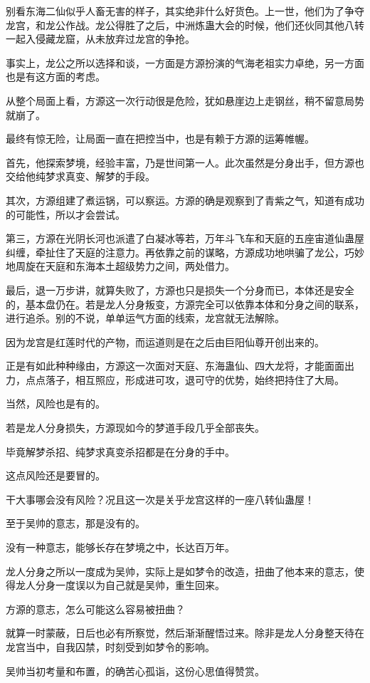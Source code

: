 \begin{this_body}
别看东海二仙似乎人畜无害的样子，其实绝非什么好货色。上一世，他们为了争夺龙宫，和龙公作战。龙公得胜了之后，中洲炼蛊大会的时候，他们还伙同其他八转一起入侵藏龙窟，从未放弃过龙宫的争抢。

事实上，龙公之所以选择和谈，一方面是方源扮演的气海老祖实力卓绝，另一方面也是有这方面的考虑。

从整个局面上看，方源这一次行动很是危险，犹如悬崖边上走钢丝，稍不留意局势就崩了。

最终有惊无险，让局面一直在把控当中，也是有赖于方源的运筹帷幄。

首先，他探索梦境，经验丰富，乃是世间第一人。此次虽然是分身出手，但方源也交给他纯梦求真变、解梦的手段。

其次，方源组建了煮运锅，可以察运。方源的确是观察到了青紫之气，知道有成功的可能性，所以才会尝试。

第三，方源在光阴长河也派遣了白凝冰等若，万年斗飞车和天庭的五座宙道仙蛊屋纠缠，牵扯住了天庭的注意力。再依靠之前的谋略，方源成功地哄骗了龙公，巧妙地周旋在天庭和东海本土超级势力之间，两处借力。

最后，退一万步讲，就算失败了，方源也只是损失一个分身而已，本体还是安全的，基本盘仍在。若是龙人分身叛变，方源完全可以依靠本体和分身之间的联系，进行追杀。别的不说，单单运气方面的线索，龙宫就无法解除。

因为龙宫是红莲时代的产物，而运道则是在之后由巨阳仙尊开创出来的。

正是有如此种种缘由，方源这一次面对天庭、东海蛊仙、四大龙将，才能面面出力，点点落子，相互照应，形成进可攻，退可守的优势，始终把持住了大局。

当然，风险也是有的。

若是龙人分身损失，方源现如今的梦道手段几乎全部丧失。

毕竟解梦杀招、纯梦求真变杀招都是在分身的手中。

这点风险还是要冒的。

干大事哪会没有风险？况且这一次是关乎龙宫这样的一座八转仙蛊屋！

至于吴帅的意志，那是没有的。

没有一种意志，能够长存在梦境之中，长达百万年。

龙人分身之所以一度成为吴帅，实际上是如梦令的改造，扭曲了他本来的意志，使得龙人分身一度误以为自己就是吴帅，重生回来。

方源的意志，怎么可能这么容易被扭曲？

就算一时蒙蔽，日后也必有所察觉，然后渐渐醒悟过来。除非是龙人分身整天待在龙宫当中，自我囚禁，时刻受到如梦令的影响。

吴帅当初考量和布置，的确苦心孤诣，这份心思值得赞赏。


\end{this_body}

